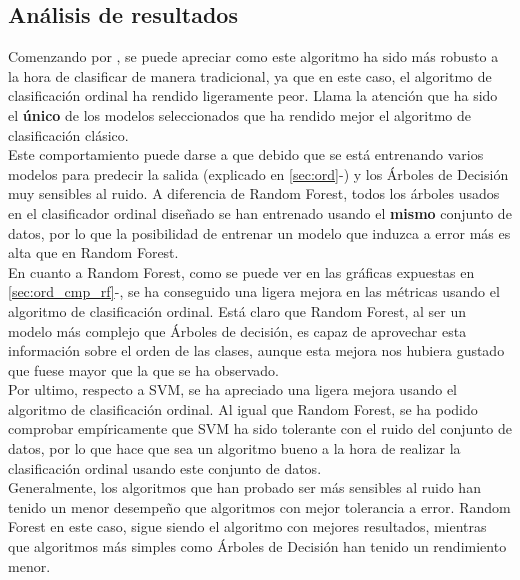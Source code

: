 \subsection{Análisis de resultados}
Comenzando por , se puede apreciar como este algoritmo ha sido más robusto a la hora de clasificar de manera tradicional, ya que en este caso, el algoritmo de clasificación ordinal ha rendido ligeramente peor. Llama la atención que ha sido el \textbf{único} de los modelos seleccionados que ha rendido mejor el algoritmo de clasificación clásico.\\
Este comportamiento puede darse a que debido que se está entrenando varios modelos para predecir la salida (explicado en \ref{sec:ord}-) y los Árboles de Decisión muy sensibles al ruido. A diferencia de Random Forest, todos los árboles usados en el clasificador ordinal diseñado se han entrenado usando el \textbf{mismo} conjunto de datos, por lo que la posibilidad de entrenar un modelo que induzca a error más es alta que en Random Forest.\\
\linebreak
En cuanto a Random Forest, como se puede ver en las gráficas expuestas en \ref{sec:ord_cmp_rf}-, se ha conseguido una ligera mejora en las métricas usando el algoritmo de clasificación ordinal. Está claro que Random Forest, al ser un modelo más complejo que Árboles de decisión, es capaz de aprovechar esta información sobre el orden de las clases, aunque esta mejora nos hubiera gustado que fuese mayor que la que se ha observado.\\
\linebreak
Por ultimo, respecto a SVM, se ha apreciado una ligera mejora usando el algoritmo de clasificación ordinal. Al igual que Random Forest, se ha podido comprobar empíricamente que SVM ha sido tolerante con el ruido del conjunto de datos, por lo que hace que sea un algoritmo bueno a la hora de realizar la clasificación ordinal usando este conjunto de datos.\\
\linebreak
Generalmente, los algoritmos que han probado ser más sensibles al ruido han tenido un menor desempeño que algoritmos con mejor tolerancia a error. Random Forest en este caso, sigue siendo el algoritmo con mejores resultados, mientras que algoritmos más simples como Árboles de Decisión han tenido un rendimiento menor.
\clearpage
